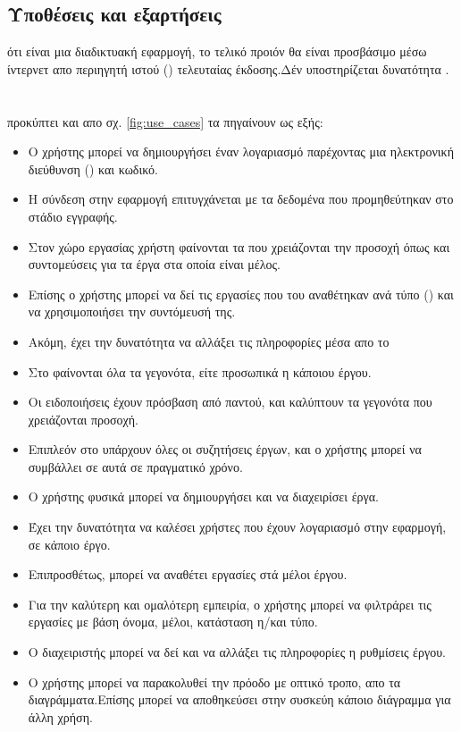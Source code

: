 \subsection*{Υποθέσεις και εξαρτήσεις}
 ότι είναι μια διαδικτυακή εφαρμογή, το τελικό προιόν θα είναι προσβάσιμο μέσω ίντερνετ απο περιηγητή ιστού () τελευταίας έκδοσης.Δέν υποστηρίζεται δυνατότητα .

\section{}
\subsection*{}
 προκύπτει και απο σχ. \ref{fig:use_cases} τα  πηγαίνουν ως εξής:
\begin{itemize}
	\item Ο χρήστης μπορεί να δημιουργήσει έναν λογαριασμό παρέχοντας μια ηλεκτρονική διεύθυνση () και κωδικό.
	\item Η σύνδεση στην εφαρμογή επιτυγχάνεται με τα δεδομένα που προμηθεύτηκαν στο στάδιο εγγραφής.
	\item Στον χώρο εργασίας χρήστη φαίνονται τα  που χρειάζονται την προσοχή όπως και συντομεύσεις για τα έργα στα οποία είναι μέλος.
	\item Επίσης ο χρήστης μπορεί να δεί τις εργασίες που του αναθέτηκαν ανά τύπο () και να χρησιμοποιήσει την συντόμευσή της.
	\item Ακόμη, έχει την δυνατότητα να αλλάξει τις πληροφορίες μέσα απο το 
	\item Στο  φαίνονται όλα τα γεγονότα, είτε προσωπικά η κάποιου έργου.
	\item Οι ειδοποιήσεις έχουν πρόσβαση από παντού, και καλύπτουν τα γεγονότα που χρειάζονται προσοχή.
	\item Επιπλεόν στο  υπάρχουν όλες οι συζητήσεις έργων, και ο χρήστης μπορεί να συμβάλλει σε αυτά σε πραγματικό χρόνο.
	\item Ο χρήστης φυσικά μπορεί να δημιουργήσει και να διαχειρίσει έργα.
	\item Έχει την δυνατότητα να καλέσει χρήστες που έχουν λογαριασμό στην εφαρμογή, σε κάποιο έργο.
	\item Επιπροσθέτως, μπορεί να αναθέτει εργασίες στά μέλοι έργου.
	\item Για την καλύτερη και ομαλότερη εμπειρία, ο χρήστης μπορεί να φιλτράρει τις εργασίες με βάση όνομα, μέλοι, κατάσταση η/και τύπο.
	\item Ο διαχειριστής μπορεί να δεί και να αλλάξει τις πληροφορίες η ρυθμίσεις έργου.
	\item Ο χρήστης μπορεί να παρακολυθεί την πρόοδο με οπτικό τροπο, απο τα διαγράμματα.Επίσης μπορεί να αποθηκεύσει στην συσκεύη κάποιο διάγραμμα για άλλη χρήση.
\end{itemize}

